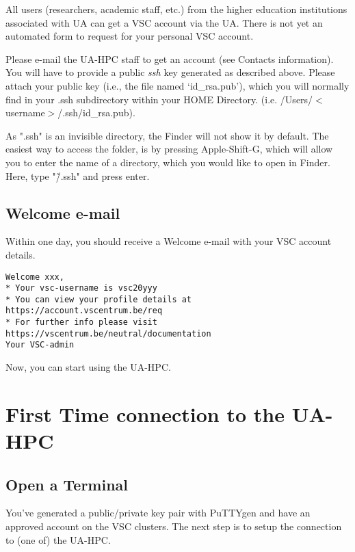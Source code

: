 All users (researchers, academic staff, etc.) from the higher education
institutions associated with UA can get a VSC account via the UA. There is not
yet an automated form to request for your personal VSC account.

Please e-mail the UA-HPC staff to get an account (see Contacts information).
You will have to provide a public \textit{ssh} key generated as described
above. Please attach your public key (i.e., the file named `id\_rsa.pub'),
which you will normally find in your .ssh subdirectory within your HOME
Directory. (i.e. /Users/$<$username$>$/.ssh/id\_rsa.pub).


\ifmac

  \textbf{} As ".ssh" is an invisible directory, the Finder will
  not show it by default. The easiest way to access the folder, is by pressing
  Apple-Shift-G, which will allow you to enter the name of a directory, which
  you would like to open in Finder. Here, type "\~/.ssh" and press enter.

\fi

\subsection{Welcome e-mail}
\label{sec:welcome-email}

Within one day, you should receive a Welcome e-mail with your VSC account details.

\begin{verbatim}
Welcome xxx,
* Your vsc-username is vsc20yyy
* You can view your profile details at https://account.vscentrum.be/req
* For further info please visit https://vscentrum.be/neutral/documentation
Your VSC-admin
\end{verbatim}

Now, you can start using the UA-HPC.

\section{First Time connection to the UA-HPC}
\label{sec:first-time-connection-to-the-hpc}

\ifwindows

  \subsection{Open a Terminal}
  \label{sec:windows-open-a-terminal}

  You've generated a public/private key pair with PuTTYgen and have an approved
  account on the VSC clusters.  The next step is to setup the connection to (one
  of) the UA-HPC.

